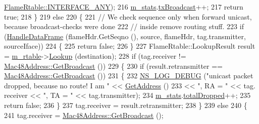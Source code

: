 \begin{DoxyCode}
      \hyperlink{classns3_1_1flame_1_1FlameRtable_a355b8bbdfec725bb9ccfddc8f3302573}{FlameRtable::INTERFACE\_ANY});
216           \hyperlink{classns3_1_1flame_1_1FlameProtocol_a9f33727e9f2483dc9d929a7a82956e0c}{m\_stats}.\hyperlink{structns3_1_1flame_1_1FlameProtocol_1_1Statistics_a0ba404c358cf7b3dda7eef14e20ddeac}{txBroadcast}++;
217           \textcolor{keywordflow}{return} \textcolor{keyword}{true};
218         \}
219       \textcolor{keywordflow}{else}
220         \{
221           \textcolor{comment}{// We check sequence only when forward unicast, because broadcast-checks were done}
222           \textcolor{comment}{// inside remove routing stuff.}
223           \textcolor{keywordflow}{if} (\hyperlink{classns3_1_1flame_1_1FlameProtocol_a72291eec881a8d8e1233695c0d382a52}{HandleDataFrame} (flameHdr.GetSeqno (), source, flameHdr, tag.transmitter, 
      sourceIface))
224             \{
225               \textcolor{keywordflow}{return} \textcolor{keyword}{false};
226             \}
227           FlameRtable::LookupResult result = \hyperlink{classns3_1_1flame_1_1FlameProtocol_a6165f21594140afd0df03510fb61eb33}{m\_rtable}->\hyperlink{classns3_1_1flame_1_1FlameRtable_a0325101feac0af5e36ed5e29d2e7e74a}{Lookup} (destination);
228           \textcolor{keywordflow}{if} (tag.receiver != \hyperlink{classns3_1_1Mac48Address_a55156e302c6bf950c0b558365adbde84}{Mac48Address::GetBroadcast} ())
229             \{
230               \textcolor{keywordflow}{if} (result.retransmitter == \hyperlink{classns3_1_1Mac48Address_a55156e302c6bf950c0b558365adbde84}{Mac48Address::GetBroadcast} ())
231                 \{
232                   \hyperlink{group__logging_ga413f1886406d49f59a6a0a89b77b4d0a}{NS\_LOG\_DEBUG} (\textcolor{stringliteral}{"unicast packet dropped, because no route! I am "} << 
      \hyperlink{classns3_1_1flame_1_1FlameProtocol_a837bba2752ab7f2edfb4fc0488656c0a}{GetAddress} ()
233                                                                                   << \textcolor{stringliteral}{", RA = "} << tag.
      receiver << \textcolor{stringliteral}{", TA = "} << tag.transmitter);
234                   \hyperlink{classns3_1_1flame_1_1FlameProtocol_a9f33727e9f2483dc9d929a7a82956e0c}{m\_stats}.\hyperlink{structns3_1_1flame_1_1FlameProtocol_1_1Statistics_a9bbb45f9d30c589661435636b6065ef7}{totalDropped}++;
235                   \textcolor{keywordflow}{return} \textcolor{keyword}{false};
236                 \}
237               tag.receiver = result.retransmitter;
238             \}
239           \textcolor{keywordflow}{else}
240             \{
241               tag.receiver = \hyperlink{classns3_1_1Mac48Address_a55156e302c6bf950c0b558365adbde84}{Mac48Address::GetBroadcast} ();

\end{DoxyCode}
